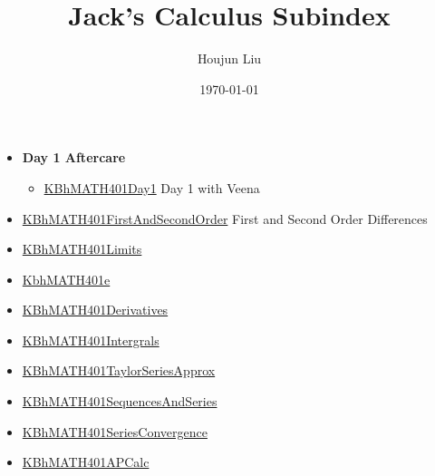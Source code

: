 \documentclass[letterpaper]{article}
\author{Houjun Liu}
\date{\today}
\title{Jack's Calculus Subindex}
\renewcommand\maketitle{}
\begin{document}
\maketitle
\begin{itemize}
\item \textbf{Day 1 Aftercare}

\begin{itemize}
\item \href{KBhMATH401Day1.org}{KBhMATH401Day1} Day 1 with Veena
\end{itemize}

\item \href{KBhMATH401FirstAndSecondOrder.org}{KBhMATH401FirstAndSecondOrder}
First and Second Order Differences
\item \href{KBhMATH401Limits.org}{KBhMATH401Limits}
\item \href{KbhMATH401e.org}{KbhMATH401e}
\item \href{KBhMATH401Derivatives.org}{KBhMATH401Derivatives}
\item \href{KBhMATH401Intergrals.org}{KBhMATH401Intergrals}
\item \href{KBhMATH401TaylorSeriesApprox.org}{KBhMATH401TaylorSeriesApprox}
\item \href{KBhMATH401SequencesAndSeries.org}{KBhMATH401SequencesAndSeries}
\item \href{KBhMATH401SeriesConvergence.org}{KBhMATH401SeriesConvergence}
\item \href{KBhMATH401APCalc.org}{KBhMATH401APCalc}
\end{itemize}
\end{document}
